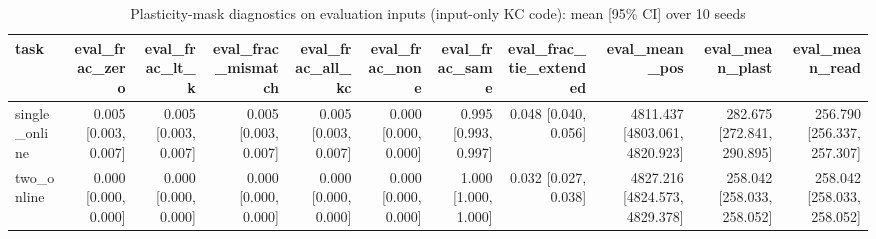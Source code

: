 \begin{table}[t]
\centering
\small
\begin{tabular}{lrrrrrrrrrr}
\toprule
task & eval\_frac\_zero & eval\_frac\_lt\_k & eval\_frac\_mismatch & eval\_frac\_all\_kc & eval\_frac\_none & eval\_frac\_same & eval\_frac\_tie\_extended & eval\_mean\_pos & eval\_mean\_plast & eval\_mean\_read \\
\midrule
single\_online & 0.005 [0.003, 0.007] & 0.005 [0.003, 0.007] & 0.005 [0.003, 0.007] & 0.005 [0.003, 0.007] & 0.000 [0.000, 0.000] & 0.995 [0.993, 0.997] & 0.048 [0.040, 0.056] & 4811.437 [4803.061, 4820.923] & 282.675 [272.841, 290.895] & 256.790 [256.337, 257.307] \\
two\_online & 0.000 [0.000, 0.000] & 0.000 [0.000, 0.000] & 0.000 [0.000, 0.000] & 0.000 [0.000, 0.000] & 0.000 [0.000, 0.000] & 1.000 [1.000, 1.000] & 0.032 [0.027, 0.038] & 4827.216 [4824.573, 4829.378] & 258.042 [258.033, 258.052] & 258.042 [258.033, 258.052] \\
\bottomrule
\end{tabular}
\caption{Plasticity-mask diagnostics on evaluation inputs (input-only KC code): mean [95\% CI] over 10 seeds}
\label{tab:kc_diag_freq_eval}
\end{table}